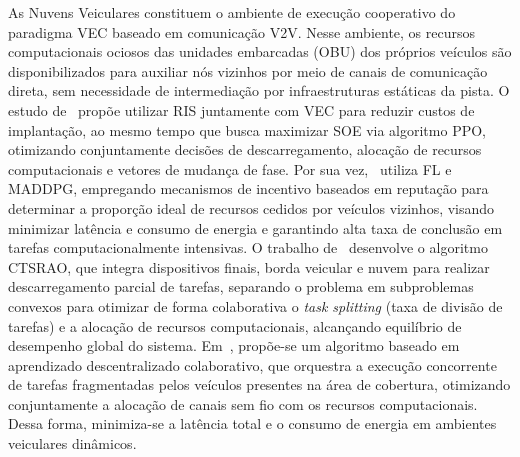 As Nuvens Veiculares constituem o ambiente de execução cooperativo do paradigma \gls{VEC} baseado em comunicação \gls{V2V}. Nesse ambiente, os recursos computacionais ociosos das unidades embarcadas (\gls{OBU}) dos próprios veículos são disponibilizados para auxiliar nós vizinhos por meio de canais de comunicação direta, sem necessidade de intermediação por infraestruturas estáticas da pista. O estudo de~\cite{xie2025} propõe utilizar \gls{RIS} juntamente com \gls{VEC} para reduzir custos de implantação, ao mesmo tempo que busca maximizar \gls{SOE} via algoritmo \gls{PPO}, otimizando conjuntamente decisões de descarregamento, alocação de recursos computacionais e vetores de mudança de fase. Por sua vez,~\cite{wu2025ava} utiliza \gls{FL} e \gls{MADDPG}, empregando mecanismos de incentivo baseados em reputação para determinar a proporção ideal de recursos cedidos por veículos vizinhos, visando minimizar latência e consumo de energia e garantindo alta taxa de conclusão em tarefas computacionalmente intensivas. O trabalho de~\cite{long2025} desenvolve o algoritmo \gls{CTSRAO}, que integra dispositivos finais, borda veicular e nuvem para realizar descarregamento parcial de tarefas, separando o problema em subproblemas convexos para otimizar de forma colaborativa o \textit{task splitting} (taxa de divisão de tarefas) e a alocação de recursos computacionais, alcançando equilíbrio de desempenho global do sistema. Em~\cite{abbas2025}, propõe-se um algoritmo baseado em aprendizado descentralizado colaborativo, que orquestra a execução concorrente de tarefas fragmentadas pelos veículos presentes na área de cobertura, otimizando conjuntamente a alocação de canais sem fio com os recursos computacionais. Dessa forma, minimiza-se a latência total e o consumo de energia em ambientes veiculares dinâmicos.

